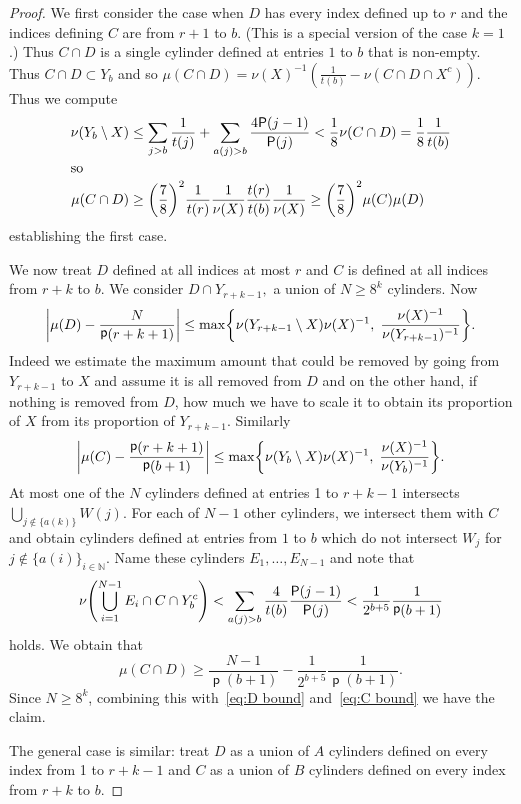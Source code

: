 \documentclass[AHL,Unicode,longabstracts,published]{cedram}
\DeclareMathOperator{\p}{\mathsf{p}}
\newcommand{\N}{\mathbb{N}}
\renewcommand{\P}{\mathsf{P}}
\let\originalleft\left
\let\originalright\right
\renewcommand{\left}{\mathopen{}\mathclose\bgroup\originalleft}
\renewcommand{\right}{\aftergroup\egroup\originalright}
\begin{document}
\begin{proof}
We first consider the case when $D$ has every index defined up to $r$ and the indices defining $C$ are from $r+1$ to $b$. (This is a special version of the case $k=1$.) Thus $C \cap D$ is a single cylinder defined at entries $1$ to $b$ that is non-empty. Thus $ C \cap D \subset Y_b$ and so $\mu(C \cap D)=\nu(X)^{-1}(\frac 1 {t(b)} -\nu(C \cap D \cap X^c))$. Thus we compute
\begin{align*}
\nu(Y_b \setminus X) &\leq \sum_{j>b} \frac{1}{t(j)} + \sum_{a(j)>b} \frac{4\P(j-1)}{\P(j)}<\frac{1}{8} \nu(C \cap D) = \frac{1}{8} \frac {1}{t(b)}
\\
\intertext{so}
\mu(C\cap D) &\geq \left(\frac{7}{8} \right)^2 \frac{1}{t(r)} \frac{1}{\nu(X)} \frac{t(r)}{t(b)} \frac{1}{\nu(X)} \geq \left(\frac{7}{8}\right)^2\mu(C) \mu(D)
\end{align*}
establishing the first case.



We now treat $D$ defined at all indices at most $r$ and $C$ is defined at all indices from $r+k$ to $b$. We consider $D \cap Y_{r+k-1},$ a union of $N\geq 8^k $ cylinders. Now
\begin{equation}\label{eq:D bound}
\left| \mu(D)-\frac{N}{\p(r+k+1)} \right|
\leq
\max \left\{
\nu\left(Y_{r+k-1}\setminus X\right)\nu(X)^{-1},\;
\frac{\nu(X)^{-1}}{\nu(Y_{r+k-1})^{-1}}
\right\}.
\end{equation}
Indeed we estimate the maximum amount that could be removed by going from $Y_{r+k-1}$ to $X$ and assume it is all removed from $D$ and on the other hand, if nothing is removed from $D$, how much we have to scale it to obtain its proportion of $X$ from its proportion of $Y_{r+k-1}$. Similarly
\begin{equation}\label{eq:C bound}
\left| \mu(C)-\frac{\p(r+k+1)}{\p(b+1)} \right|
\leq
\max \left\{ \nu(Y_{b}\setminus X)\nu(X)^{-1},\; \frac{\nu(X)^{-1}}{\nu(Y_{b})^{-1}} \right\}.
\end{equation}
At most one of the $N$ cylinders defined at entries 1 to $r+k-1$ intersects $\bigcup_{j \notin \{a(k)\}}W(j)$. For each of $N-1$ other cylinders, we intersect them with $C$ and obtain cylinders defined at entries from $1$ to $b$ which do not intersect $W_j$ for $j \notin \{a(i)\}_{i \in \N}.$ Name these cylinders $E_1,\dots,E_{N-1}$ and note that
\[
\nu \left(\bigcup_{i=1}^{N-1}E_i \cap C \cap Y_b^c \right) <
\sum_{a(j)>b}\frac 4 {t(b)}\frac{\P(j-1)}{\P(j)}< \frac 1 {2^{b+5}}\frac 1 {\p(b+1)}
\]
holds. We obtain that
\[
\mu(C \cap D) \geq \frac{N-1}{\p(b+1)}-\frac{1}{2^{b+5}}\frac{1}{\p(b+1)}.
\]
Since $N\geq 8^k$, combining this with~\eqref{eq:D bound} and~\eqref{eq:C bound} we have the claim.

The general case is similar: treat $D$ as a union of $A$ cylinders defined on every index from 1 to $r+k-1$ and $C$ as a union of $B$ cylinders defined on every index from $r+k$ to $b$.
\end{proof}
\end{document}

